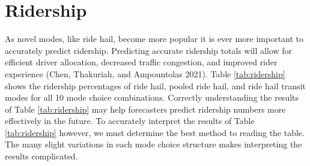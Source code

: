 \documentclass[12pt, oneside, openright]{byuthesis}
\begin{document}
\hypertarget{res-ridership}{%
\section{Ridership}\label{res-ridership}}

As novel modes, like ride hail, become more popular it is ever more important to accurately predict ridership. Predicting accurate ridership totals will allow for efficient driver allocation, decreased traffic congestion, and improved rider experience (Chen, Thakuriah, and Ampountolas 2021). Table \ref{tab:ridership} shows the ridership percentages of ride hail, pooled ride hail, and ride hail transit modes for all 10 mode choice combinations. Correctly understanding the results of Table \ref{tab:ridership} may help forecasters predict ridership numbers more effectively in the future. To accurately interpret the results of Table \ref{tab:ridership} however, we must determine the best method to reading the table. The many slight variations in each mode choice structure makes interpreting the results complicated.

\begin{table}

\caption{\label{tab:ridership}Percent ride hail ridership by mode choice combination scenario.}
\centering
{}
\end{table}
\end{document}
